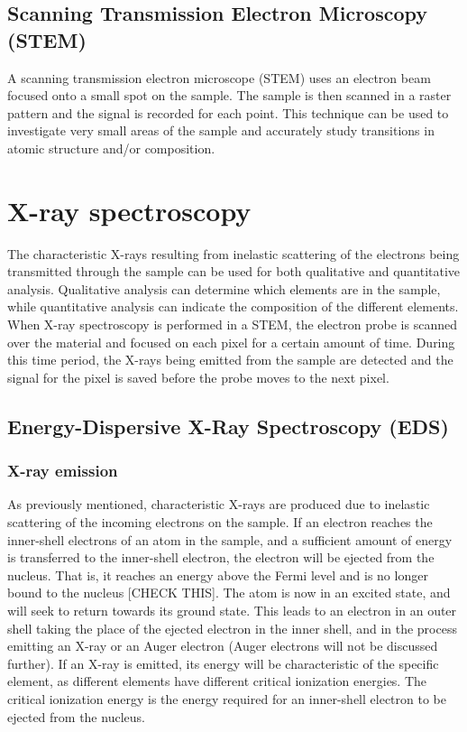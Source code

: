 	\subsection{Scanning Transmission Electron Microscopy (STEM)}
A scanning transmission electron microscope (STEM) uses an electron beam focused onto a small spot on the sample. The sample is then scanned in a raster pattern and the signal is recorded for each point. This technique can be used to investigate very small areas of the sample and accurately study transitions in atomic structure and/or composition.

\section{X-ray spectroscopy}\label{EDS}
The characteristic X-rays resulting from inelastic scattering of the electrons being transmitted through the sample can be used for both qualitative and quantitative analysis. Qualitative analysis can determine which elements are in the sample, while quantitative analysis can indicate the composition of the different elements. When X-ray spectroscopy is performed in a STEM, the electron probe is scanned over the material and focused on each pixel for a certain amount of time. During this time period, the X-rays being emitted from the sample are detected and the signal for the pixel is saved before the probe moves to the next pixel. 

	\subsection{Energy-Dispersive X-Ray Spectroscopy (EDS)} %
		\subsubsection{X-ray emission}
As previously mentioned, characteristic X-rays are produced due to inelastic scattering of the incoming electrons on the sample. If an electron reaches the inner-shell electrons of an atom in the sample, and a sufficient amount of energy is transferred to the inner-shell electron, the electron will be ejected from the nucleus. That is, it reaches an energy above the Fermi level and is no longer bound to the nucleus [CHECK THIS]. The atom is now in an excited state, and will seek to return towards its ground state. This leads to an electron in an outer shell taking the place of the ejected electron in the inner shell, and in the process emitting an X-ray or an Auger electron (Auger electrons will not be discussed further). If an X-ray is emitted, its energy will be characteristic of the specific element, as different elements have different critical ionization energies. The critical ionization energy is the energy required for an inner-shell electron to be ejected from the nucleus.

